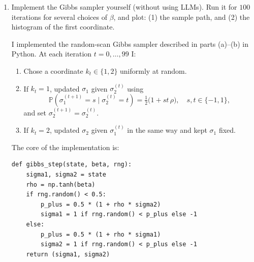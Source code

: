 \documentclass[answers,12pt,addpoints]{exam}
\begin{document}
\begin{enumerate}
\begin{solution}
\medskip
\noindent\textbf{Spectral gap and limit $\beta\to\infty$.}
Thus the four eigenvalues of $P$ are
\[
\lambda_0 = 1,\quad
\lambda_1 = \lambda_2 = \frac{1+\rho}{2},\quad
\lambda_3 = 0.
\]
The spectral gap is defined as
\[
\gamma = 1 - \max\{|\lambda|:\lambda\neq 1\}
= 1 - \max\left\{\frac{1+\rho}{2},\,0\right\}
= 1 - \frac{1+\rho}{2}
= \frac{1-\rho}{2}.
\]
Since $\rho = \tanh\beta \to 1$ as $\beta\to\infty$, we have
\[
\gamma(\beta) = \frac{1-\tanh\beta}{2} \longrightarrow 0
\quad\text{as }\beta\to\infty.
\]
Thus the spectral gap goes to $0$ as $\beta\to\infty$.
\end{solution}
\item Implement the Gibbs sampler yourself (without using LLMs). Run it for $100$ iterations for several choices of $\beta$, and plot: (1) the sample path, and (2) the histogram of the first coordinate.\\
\begin{solution}
I implemented the random-scan Gibbs sampler described in parts (a)--(b) in Python.
At each iteration $t=0,\dots,99$ I:
\begin{enumerate}
\item Chose a coordinate $k_t \in \{1,2\}$ uniformly at random.
\item If $k_t=1$, updated $\sigma_1$ given $\sigma_2^{(t)}$ using
\[
\mathbb{P}(\sigma_1^{(t+1)} = s \mid \sigma_2^{(t)} = t)
= \tfrac{1}{2}\bigl(1 + s t\,\rho\bigr), \quad s,t\in\{-1,1\},
\]
and set $\sigma_2^{(t+1)}=\sigma_2^{(t)}$.
\item If $k_t=2$, updated $\sigma_2$ given $\sigma_1^{(t)}$ in the same way
and kept $\sigma_1$ fixed.
\end{enumerate}
The core of the implementation is:

\begin{verbatim}
def gibbs_step(state, beta, rng):
    sigma1, sigma2 = state
    rho = np.tanh(beta)
    if rng.random() < 0.5:
        p_plus = 0.5 * (1 + rho * sigma2)
        sigma1 = 1 if rng.random() < p_plus else -1
    else:
        p_plus = 0.5 * (1 + rho * sigma1)
        sigma2 = 1 if rng.random() < p_plus else -1
    return (sigma1, sigma2)
\end{verbatim}


\end{solution}
\end{enumerate}
\end{document}

